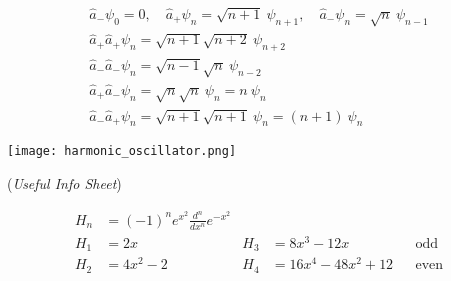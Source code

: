 
\begin{gather*}
    \widehat{a}_{-}\psi_0 = 0, \quad \widehat{a}_{+}\psi_n = \sqrt{n+1}\:\psi_{n+1}, \quad \widehat{a}_{-}\psi_n = \sqrt{n}\:\psi_{n-1}\\
    \widehat{a}_{+}\widehat{a}_{+}\psi_n = \sqrt{n+1}\sqrt{n+2}\:\psi_{n+2}\\
    \widehat{a}_{-}\widehat{a}_{-}\psi_n = \sqrt{n-1}\sqrt{n}\:\psi_{n-2}\\
    \widehat{a}_{+}\widehat{a}_{-}\psi_n = \sqrt{n}\sqrt{n}\:\psi_{n} = n \:\psi_{n}\\
    \widehat{a}_{-}\widehat{a}_{+}\psi_n = \sqrt{n+1}\sqrt{n+1}\:\psi_{n} = (n+1)\:\psi_{n}
\end{gather*}

\begin{center}
    \texttt{[image: harmonic\_oscillator.png]}
\end{center}

 (\textit{Useful Info Sheet})

\noindent\begin{align*}
    H_n & = {(-1)}^n e^{x^2} \frac{d^n}{dx^n} e^{-x^2}                                           \\
    H_1 & = 2x                                         & H_3 & = 8x^3-12x       &  & \text{odd}  \\
    H_2 & = 4x^2-2                                     & H_4 & = 16x^4-48x^2+12 &  & \text{even}
\end{align*}

